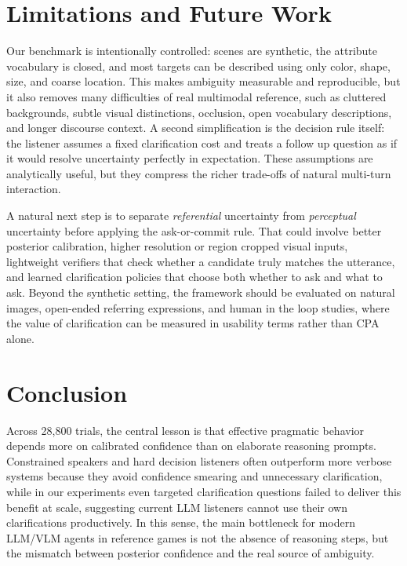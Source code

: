 \documentclass[11pt]{article}
\begin{document}
\section{Limitations and Future Work}
\label{sec:limitations}

Our benchmark is intentionally controlled: scenes are synthetic, the attribute vocabulary is closed, and most targets can be described using only color, shape, size, and coarse location. This makes ambiguity measurable and reproducible, but it also removes many difficulties of real multimodal reference, such as cluttered backgrounds, subtle visual distinctions, occlusion, open vocabulary descriptions, and longer discourse context. A second simplification is the decision rule itself: the listener assumes a fixed clarification cost and treats a follow up question as if it would resolve uncertainty perfectly in expectation. These assumptions are analytically useful, but they compress the richer trade-offs of natural multi-turn interaction.

A natural next step is to separate \emph{referential} uncertainty from \emph{perceptual} uncertainty before applying the ask-or-commit rule. That could involve better posterior calibration, higher resolution or region cropped visual inputs, lightweight verifiers that check whether a candidate truly matches the utterance, and learned clarification policies that choose both whether to ask and what to ask. Beyond the synthetic setting, the framework should be evaluated on natural images, open-ended referring expressions, and human in the loop studies, where the value of clarification can be measured in usability terms rather than CPA alone.

\section{Conclusion}
\label{sec:conclusion}

Across 28{,}800 trials, the central lesson is that effective pragmatic behavior depends more on calibrated confidence than on elaborate reasoning prompts. Constrained speakers and hard decision listeners often outperform more verbose systems because they avoid confidence smearing and unnecessary clarification, while in our experiments even targeted clarification questions failed to deliver this benefit at scale, suggesting current LLM listeners cannot use their own clarifications productively. In this sense, the main bottleneck for modern LLM/VLM agents in reference games is not the absence of reasoning steps, but the mismatch between posterior confidence and the real source of ambiguity.
\end{document}
